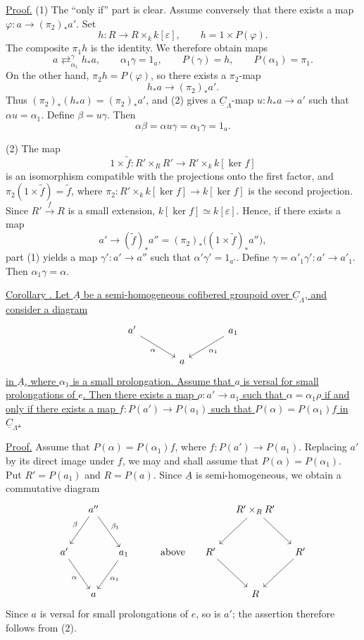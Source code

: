 \underline{Proof.} (1) The ``only if'' part is clear. Assume conversely
that there exists a map
$\varphi:a\longrightarrow(\pi_2)_*a'$. Set
\[
 h:R\longrightarrow R\times_k k[\varepsilon],
 \qquad h=1\times P(\varphi).
\]
The composite $\pi_1h$ is the identity. We therefore obtain maps
\[
 a\mathrel{\mathop{\rightleftarrows}^{\gamma}_{\alpha_1}}h_*a,
 \qquad \alpha_1\gamma=1_a,
 \qquad P(\gamma)=h,
 \qquad P(\alpha_1)=\pi_1.
\]
On the other hand, $\pi_2h=P(\varphi)$, so there exists a
$\pi_2$-map
\[
 h_*a\longrightarrow(\pi_2)_*a'.
\]
Thus $(\pi_2)_*(h_*a)=(\pi_2)_*a'$, and (2) gives a
$\underline C_\Lambda$-map $u:h_*a\longrightarrow a'$ such that
$\alpha u=\alpha_1$. Define $\beta=u\gamma$. Then
\[
 \alpha\beta=\alpha u\gamma=\alpha_1\gamma=1_a.
\]

(2) The map
\[
 1\times\widetilde f:R'\times_RR'
 \longrightarrow R'\times_k k[\ker f]
\]
is an isomorphism compatible with the projections onto the first
factor, and $\pi_2(1\times\widetilde f)=\widetilde f$, where
$\pi_2:R'\times_k k[\ker f]\longrightarrow k[\ker f]$ is the second
projection. Since $R'\xrightarrow fR$ is a small extension,
$k[\ker f]\simeq k[\varepsilon]$. Hence, if there exists a map
\[
 a'\longrightarrow(\widetilde f)_*a''
   =(\pi_2)_*\bigl((1\times\widetilde f)_*a''\bigr),
\]
part (1) yields a map $\gamma':a'\longrightarrow a''$ such that
$\alpha'\gamma'=1_{a'}$. Define
$\gamma=\alpha'_1\gamma':a'\longrightarrow a'_1$. Then
$\alpha_1\gamma=\alpha$.


\underline{Corollary . Let $\underline A$ be a semi-homogeneous
cofibered groupoid over $\underline C_\Lambda$, and consider a diagram}
\[
\begin{tikzcd}[column sep=large]
a' \arrow[dr,"\alpha"'] & & a_1 \arrow[dl,"\alpha_1"] \\
& a &
\end{tikzcd}
\]
\underline{in $\underline A$, where $\alpha_1$ is a small
prolongation. Assume that $a$ is versal for small prolongations of
$e$. Then there exists a map $\rho:a'\longrightarrow a_1$ such that
$\alpha=\alpha_1\rho$ if and only if there exists a map
$f:P(a')\longrightarrow P(a_1)$ such that
$P(\alpha)=P(\alpha_1)f$ in $\underline C_\Lambda$.}

\underline{Proof.} Assume that $P(\alpha)=P(\alpha_1)f$, where
$f:P(a')\longrightarrow P(a_1)$. Replacing $a'$ by its direct image
under $f$, we may and shall assume that
$P(\alpha)=P(\alpha_1)$. Put $R'=P(a_1)$ and $R=P(a)$. Since
$\underline A$ is semi-homogeneous, we obtain a commutative diagram
\[
\begin{tikzcd}[row sep=large,column sep=small]
& a'' \arrow[dl,"\beta"'] \arrow[dr,"\beta_1"]
  & & & & & R'\times_RR' \arrow[dl] \arrow[dr] & \\
a' \arrow[dr,"\alpha"'] & & a_1 \arrow[dl,"\alpha_1"]
  & & \text{above} & R' \arrow[dr] & & R' \arrow[dl] \\
& a & & & & & R &
\end{tikzcd}
\]
Since $a$ is versal for small prolongations of $e$, so is $a'$;
the assertion therefore follows from (2).

